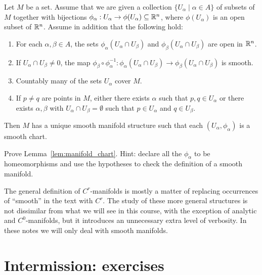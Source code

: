 \begin{lemma}\label{lem:manifold_chart}
  Let $M$ be a set. Assume that we are given a collection $\{U_\alpha\mid \alpha\in A\}$ of subsets of $M$ together with bijections $\phi_\alpha: U_\alpha\to\phi(U_\alpha)\subseteq\mathbb{R}^n$, where $\phi(U_\alpha)$ is an open subset of $\mathbb{R}^n$. Assume in addition that the following hold:
  \begin{enumerate}
    \item For each $\alpha, \beta \in A$, the sets $\phi_\alpha(U_\alpha \cap U_\beta)$ and $\phi_\beta(U_\alpha \cap U_\beta)$ are open in $\mathbb{R}^n$.
    \item If $U_\alpha \cap U_\beta \neq 0$, the map $\phi_\beta\circ\phi_\alpha^{-1}: \phi_\alpha(U_\alpha \cap U_\beta)\to \phi_\beta(U_\alpha \cap U_\beta)$ is smooth.
    \item Countably many of the sets $U_\alpha$ cover $M$.
    \item If $p\neq q$ are points in $M$, either there exists $\alpha$ such that $p,q\in U_\alpha$ or there exists $\alpha,\beta$ with $U_\alpha\cap U_\beta=\emptyset$ such that $p\in U_\alpha$ and $q\in U_\beta$.
  \end{enumerate}
  Then $M$ has a unique smooth manifold structure such that each $(U_\alpha,\phi_\alpha)$ is a smooth chart.
\end{lemma}
\begin{exercise}
  Prove Lemma~\ref{lem:manifold_chart}. Hint: declare all the $\phi_\alpha$ to be homeomorphisms and use the hypotheses to check the definition of a smooth manifold.
\end{exercise}

\begin{example}
\end{example}

\begin{tcolorbox}
  The general definition of $C^r$-manifolds is mostly a matter of replacing occurrences of ``smooth'' in the text with $C^r$.
  The study of these more general structures is not dissimilar from what we will see in this course, with the exception of analytic and $C^0$-manifolds, but it introduces an unnecessary extra level of verbosity.
  In these notes we will only deal with smooth manifolds.
\end{tcolorbox}

\section{Intermission: exercises}
\TODO

